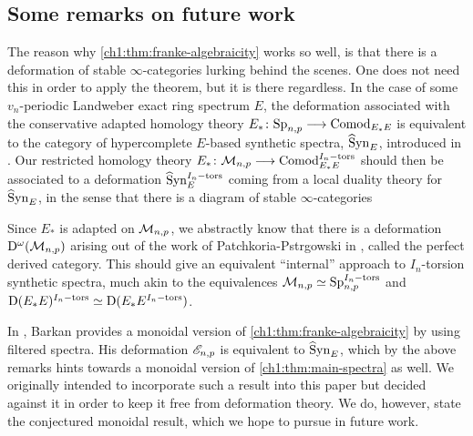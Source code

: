 



\subsection*{Some remarks on future work}

The reason why \cref{ch1:thm:franke-algebraicity} works so well, is that there is a deformation of stable $\infty$-categories lurking behind the scenes. One does not need this in order to apply the theorem, but it is there regardless. In the case of some $v_n$-periodic Landweber exact ring spectrum $E$, the deformation associated with the conservative adapted homology theory $E_*\colon \mathrm{Sp}_{n,p} \longrightarrow \mathrm{Comod}_{E_*E}$ is equivalent to the category of hypercomplete $E$-based synthetic spectra, $\widehat{\mathrm{S}}\mathrm{yn}_{E}$, introduced in \cite{pstragowski_2022}. Our restricted homology theory $E_*\colon \mathcal{M}_{n,p}\longrightarrow \mathrm{Comod}_{E_*E}^{I_n-\mathrm{tors}}$ should then be associated to a deformation $\widehat{\mathrm{S}}\mathrm{yn}_{E}^{I_n-\mathrm{tors}}$ coming from a local duality theory for $\widehat{\mathrm{S}}\mathrm{yn}_{E}$, in the sense that there is a diagram of stable $\infty$-categories 
\begin{center}
\end{center}
Since $E_*$ is adapted on $\mathcal{M}_{n,p}$, we abstractly know that there is a deformation $\mathrm{D}^\omega(\mathcal{M}_{n,p})$ arising out of the work of Patchkoria-Pstr\a{}gowski in \cite{patchkoria-pstragowski_2021}, called the perfect derived category. This should give an equivalent ``internal'' approach to $I_n$-torsion synthetic spectra, much akin to the equivalences $\mathcal{M}_{n,p}\simeq \mathrm{Sp}_{n,p}^{I_n-\mathrm{tors}}$ and $\mathrm{D}(E_*E)^{I_n-\mathrm{tors}}\simeq \mathrm{D}(E_*E^{I_n-\mathrm{tors}})$. 

In \cite{barkan_2023}, Barkan provides a monoidal version of \cref{ch1:thm:franke-algebraicity} by using filtered spectra. His deformation $\mathscr{E}_{n,p}$ is equivalent to $\widehat{\mathrm{S}}\mathrm{yn}_{E}$, which by the above remarks hints towards a monoidal version of \cref{ch1:thm:main-spectra} as well. We originally intended to incorporate such a result into this paper but decided against it in order to keep it free from deformation theory. We do, however, state the conjectured monoidal result, which we hope to pursue in future work.

